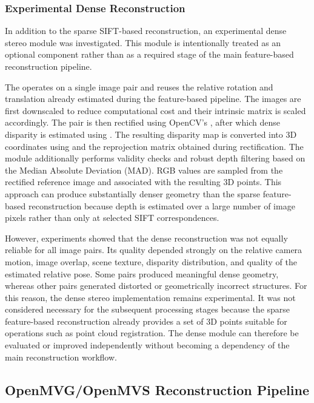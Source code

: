 \subsubsection{Experimental Dense Reconstruction}

In addition to the sparse SIFT-based reconstruction, an experimental dense
stereo module was investigated. This module is intentionally treated as an
optional component rather than as a required stage of the main
feature-based reconstruction pipeline.

The  operates on a single image pair and reuses the
relative rotation and translation already estimated during the feature-based
pipeline. The images are first downscaled to reduce computational cost and
their intrinsic matrix is scaled accordingly.
The pair is then rectified using OpenCV's
, after which dense disparity is estimated using
. The resulting disparity map is converted into 3D
coordinates using  and the reprojection matrix
obtained during rectification.
The module additionally performs validity checks and robust depth filtering
based on the Median Absolute Deviation (MAD). RGB values are sampled from the
rectified reference image and associated with the resulting 3D points.
This approach can produce substantially denser geometry than the sparse
feature-based reconstruction because depth is estimated over a large number
of image pixels rather than only at selected SIFT correspondences.

However, experiments showed that the dense reconstruction was not equally
reliable for all image pairs. Its quality depended strongly on the relative
camera motion, image overlap, scene texture, disparity distribution, and
quality of the estimated relative pose. Some pairs produced meaningful dense
geometry, whereas other pairs generated distorted or geometrically incorrect
structures.
For this reason, the dense stereo implementation remains experimental. It
was not considered necessary for the subsequent processing stages because
the sparse feature-based reconstruction already provides a set of 3D points
suitable for operations such as point cloud registration. The dense module
can therefore be evaluated or improved independently without becoming a
dependency of the main reconstruction workflow.

\subsection{OpenMVG/OpenMVS Reconstruction Pipeline}
\label{sec:openmvg_openmvs_pipeline}

